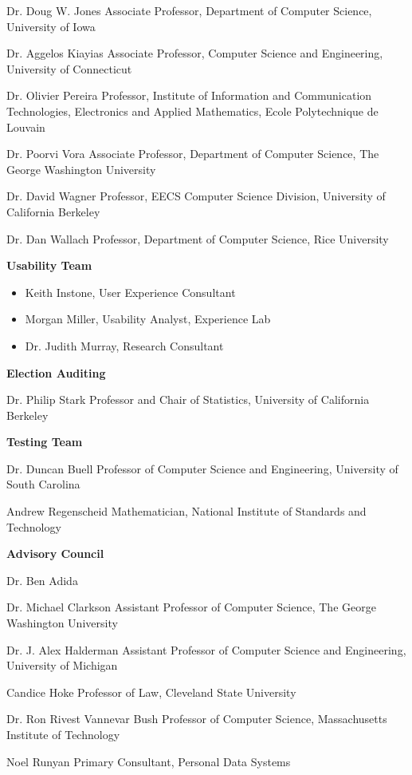 Dr. Doug W. Jones
Associate Professor, Department of Computer Science, University of Iowa
 
Dr. Aggelos Kiayias
Associate Professor, Computer Science and Engineering, University of Connecticut
 
Dr. Olivier Pereira
Professor, Institute of Information and Communication Technologies, Electronics and Applied Mathematics, Ecole Polytechnique de Louvain
 
Dr. Poorvi Vora
Associate Professor, Department of Computer Science, The George Washington University
 
Dr. David Wagner
Professor, EECS Computer Science Division, University of California Berkeley
 
Dr. Dan Wallach
Professor, Department of Computer Science, Rice University
 
\textbf{Usability Team}

\begin{itemize}
\item Keith Instone, User Experience Consultant
\item Morgan Miller, Usability Analyst, Experience Lab
\item Dr. Judith Murray, Research Consultant
\end{itemize}

\textbf{Election Auditing}

Dr. Philip Stark
Professor and Chair of Statistics, University of California Berkeley
 
\textbf{Testing Team}

Dr. Duncan Buell
Professor of Computer Science and Engineering, University of South Carolina
 
Andrew Regenscheid
Mathematician, National Institute of Standards and Technology
 
\textbf{Advisory Council}

Dr. Ben Adida
 
Dr. Michael Clarkson
Assistant Professor of Computer Science, The George Washington University
 
Dr. J. Alex Halderman
Assistant Professor of Computer Science and Engineering, University of Michigan
 
Candice Hoke
Professor of Law, Cleveland State University
 
Dr. Ron Rivest
Vannevar Bush Professor of Computer Science, Massachusetts Institute of Technology
 
Noel Runyan
Primary Consultant, Personal Data Systems
 
